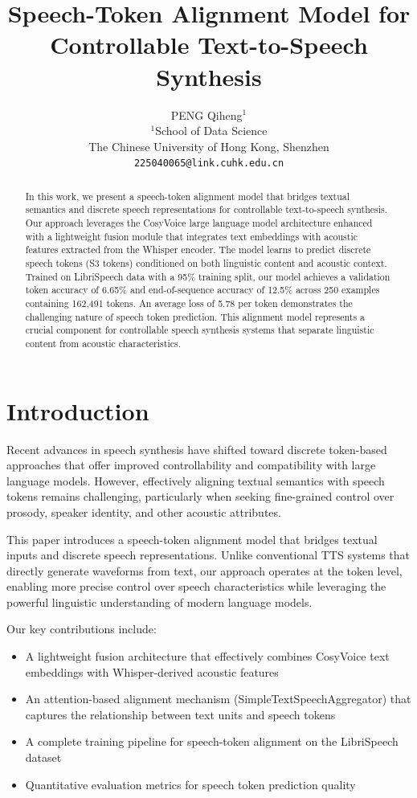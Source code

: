 \documentclass[10pt,twocolumn,letterpaper]{article}
\title{Speech-Token Alignment Model for Controllable Text-to-Speech Synthesis}
\author{PENG Qiheng$^{1}$\\
$^{1}$School of Data Science\\
The Chinese University of Hong Kong, Shenzhen\\
{\tt\small 225040065@link.cuhk.edu.cn}
}
\begin{document}
\maketitle

\begin{abstract}
In this work, we present a speech-token alignment model that bridges textual semantics and discrete speech representations for controllable text-to-speech synthesis. Our approach leverages the CosyVoice large language model architecture enhanced with a lightweight fusion module that integrates text embeddings with acoustic features extracted from the Whisper encoder. The model learns to predict discrete speech tokens (S3 tokens) conditioned on both linguistic content and acoustic context. Trained on LibriSpeech data with a 95\% training split, our model achieves a validation token accuracy of 6.65\% and end-of-sequence accuracy of 12.5\% across 250 examples containing 162,491 tokens. An average loss of 5.78 per token demonstrates the challenging nature of speech token prediction. This alignment model represents a crucial component for controllable speech synthesis systems that separate linguistic content from acoustic characteristics.
\end{abstract}

\section{Introduction}

Recent advances in speech synthesis have shifted toward discrete token-based approaches that offer improved controllability and compatibility with large language models. However, effectively aligning textual semantics with speech tokens remains challenging, particularly when seeking fine-grained control over prosody, speaker identity, and other acoustic attributes.

This paper introduces a speech-token alignment model that bridges textual inputs and discrete speech representations. Unlike conventional TTS systems that directly generate waveforms from text, our approach operates at the token level, enabling more precise control over speech characteristics while leveraging the powerful linguistic understanding of modern language models.

Our key contributions include:
\begin{itemize}
\item A lightweight fusion architecture that effectively combines CosyVoice text embeddings with Whisper-derived acoustic features
\item An attention-based alignment mechanism (SimpleTextSpeechAggregator) that captures the relationship between text units and speech tokens
\item A complete training pipeline for speech-token alignment on the LibriSpeech dataset
\item Quantitative evaluation metrics for speech token prediction quality
\end{itemize}
\end{document}
